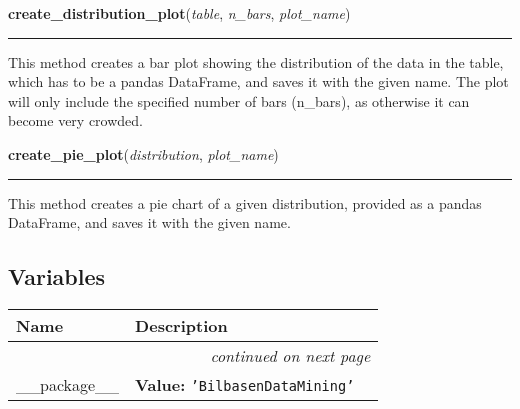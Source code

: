 \hspace{.8\funcindent}\begin{boxedminipage}{\funcwidth}

    \raggedright \textbf{create\_distribution\_plot}(\textit{table}, \textit{n\_bars}, \textit{plot\_name})

    \vspace{-1.5ex}

    \rule{\textwidth}{0.5\fboxrule}
\setlength{\parskip}{2ex}
    This method creates a bar plot showing the distribution of the data in 
    the table, which has to be a pandas DataFrame, and saves it with the 
    given name. The plot will only include the specified number of bars 
    (n\_bars), as otherwise it can become very crowded.

\setlength{\parskip}{1ex}
    \end{boxedminipage}

    \label{BilbasenDataMining:graphics:create_pie_plot}

    \vspace{0.5ex}

\hspace{.8\funcindent}\begin{boxedminipage}{\funcwidth}

    \raggedright \textbf{create\_pie\_plot}(\textit{distribution}, \textit{plot\_name})

    \vspace{-1.5ex}

    \rule{\textwidth}{0.5\fboxrule}
\setlength{\parskip}{2ex}
    This method creates a pie chart of a given distribution, provided as a 
    pandas DataFrame, and saves it with the given name.

\setlength{\parskip}{1ex}
    \end{boxedminipage}



  \subsection{Variables}

    \vspace{-1cm}
\hspace{\varindent}\begin{longtable}{|p{\varnamewidth}|p{\vardescrwidth}|l}
\cline{1-2}
\cline{1-2} \centering \textbf{Name} & \centering \textbf{Description}& \\
\cline{1-2}
\endhead\cline{1-2}\multicolumn{3}{r}{\small\textit{continued on next page}}\\\endfoot\cline{1-2}
\endlastfoot\raggedright \_\-\_\-p\-a\-c\-k\-a\-g\-e\-\_\-\_\- & \raggedright \textbf{Value:} 
{\tt \texttt{'}\texttt{BilbasenDataMining}\texttt{'}}&\\
\cline{1-2}
\end{longtable}

